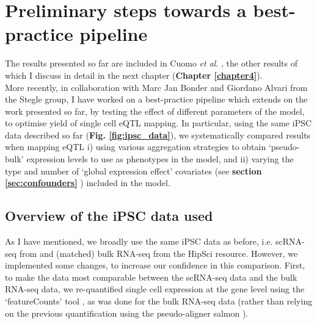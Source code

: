 \clearpage

\section{Preliminary steps towards a best-practice pipeline}
\label{sec:best_practice}

The results presented so far are included in Cuomo \textit{et al}. \cite{cuomo2020single}, the other results of which I discuss in detail in the next chapter (\textbf{Chapter 
\ref{chapter4}}). \\

More recently, in collaboration with Marc Jan Bonder and Giordano Alvari from the Stegle group, I have worked on a best-practice pipeline which extends on the work presented so far, by testing the effect of different parameters of the model, to optimise yield of single cell eQTL mapping.
In particular, using the same iPSC data described so far (\textbf{Fig. \ref{fig:ipsc_data}}), we systematically compared results when mapping eQTL i) using various aggregation strategies to obtain `pseudo-bulk' expression levels to use as phenotypes in the model, and ii) varying
the type and number of `global expression effect' covariates (see \textbf{section
\ref{sec:confounders}
}) included in the model.

\subsection{Overview of the iPSC data used}

As I have mentioned, we broadly use the same iPSC data as before, i.e. scRNA-seq from \cite{cuomo2020single} and (matched) bulk RNA-seq from the HipSci resource.
However, we implemented some changes, to increase our confidence in this comparison. 
First, to make the data most comparable between the scRNA-seq data and the bulk RNA-seq data, we re-quantified single cell expression at the gene level using the `featureCounts' tool \cite{liao2014featurecounts}, as was done for the bulk RNA-seq data (rather than relying on the previous quantification using the pseudo-aligner salmon \cite{patro2017salmon}).
\\

